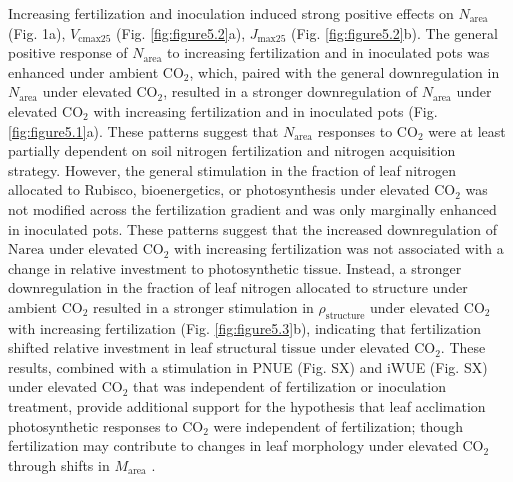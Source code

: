 Increasing fertilization and inoculation induced strong positive effects on $N_\mathrm{area}$ (Fig. 1a), $V_\mathrm{cmax25}$ (Fig. \ref{fig:figure5.2}a), $J_\mathrm{max25}$ (Fig. \ref{fig:figure5.2}b). The general positive response of $N_\mathrm{area}$ to increasing fertilization and in inoculated pots was enhanced under ambient CO$_2$, which, paired with the general downregulation in $N_\mathrm{area}$ under elevated CO$_2$, resulted in a stronger downregulation of $N_\mathrm{area}$ under elevated CO$_2$ with increasing fertilization and in inoculated pots (Fig. \ref{fig:figure5.1}a). These patterns suggest that $N_\mathrm{area}$ responses to CO$_2$ were at least partially dependent on soil nitrogen fertilization and nitrogen acquisition strategy. However, the general stimulation in the fraction of leaf nitrogen allocated to Rubisco, bioenergetics, or photosynthesis under elevated CO$_2$ was not modified across the fertilization gradient and was only marginally enhanced in inoculated pots. These patterns suggest that the increased downregulation of $\mathrm{Narea}$ under elevated CO$_2$ with increasing fertilization was not associated with a change in relative investment to photosynthetic tissue. Instead, a stronger downregulation in the fraction of leaf nitrogen allocated to structure under ambient CO$_2$ resulted in a stronger stimulation in $\rho_\mathrm{structure}$ under elevated CO$_2$ with increasing fertilization (Fig. \ref{fig:figure5.3}b), indicating that fertilization shifted relative investment in leaf structural tissue under elevated CO$_2$. These results, combined with a stimulation in PNUE (Fig. SX) and iWUE (Fig. SX) under elevated CO$_2$ that was independent of fertilization or inoculation treatment, provide additional support for the hypothesis that leaf acclimation photosynthetic responses to CO$_2$ were independent of fertilization; though fertilization may contribute to changes in leaf morphology under elevated CO$_2$ through shifts in $M_\mathrm{area}$ .

